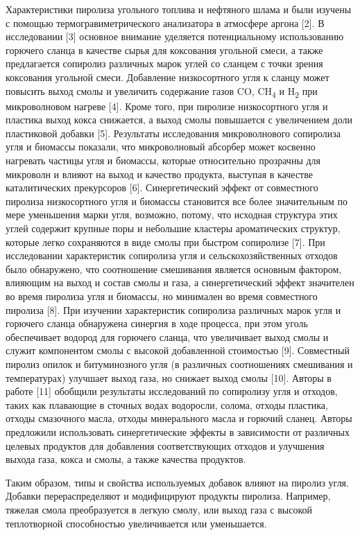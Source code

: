 \begin{multicols}{2}
Характеристики пиролиза угольного топлива и нефтяного шлама и были
изучены с помощью термогравиметрического анализатора в атмосфере аргона
{[}2{]}. В исследовании {[}3{]} основное внимание уделяется
потенциальному использованию горючего сланца в качестве сырья для
коксования угольной смеси, а также предлагается сопиролиз различных
марок углей со сланцем с точки зрения коксования угольной смеси.
Добавление низкосортного угля к сланцу может повысить выход смолы и
увеличить содержание газов CO, CH\textsubscript{4} и H\textsubscript{2}
при микроволновом нагреве {[}4{]}. Кроме того, при пиролизе
низкосортного угля и пластика выход кокса снижается, а выход смолы
повышается с увеличением доли пластиковой добавки {[}5{]}. Результаты
исследования микроволнового сопиролиза угля и биомассы показали, что
микроволновый абсорбер может косвенно нагревать частицы угля и биомассы,
которые относительно прозрачны для микроволн и влияют на выход и
качество продукта, выступая в качестве каталитических прекурсоров
{[}6{]}. Синергетический эффект от совместного пиролиза низкосортного
угля и биомассы становится все более значительным по мере уменьшения
марки угля, возможно, потому, что исходная структура этих углей содержит
крупные поры и небольшие кластеры ароматических структур, которые легко
сохраняются в виде смолы при быстром сопиролизе {[}7{]}. При
исследовании характеристик сопиролиза угля и сельскохозяйственных
отходов было обнаружено, что соотношение смешивания является основным
фактором, влияющим на выход и состав смолы и газа, а синергетический
эффект значителен во время пиролиза угля и биомассы, но минимален во
время совместного пиролиза {[}8{]}. При изучении характеристик
сопиролиза различных марок угля и горючего сланца обнаружена синергия в
ходе процесса, при этом уголь обеспечивает водород для горючего сланца,
что увеличивает выход смолы и служит компонентом смолы с высокой
добавленной стоимостью {[}9{]}. Совместный пиролиз опилок и
битуминозного угля (в различных соотношениях смешивания и температурах)
улучшает выход газа, но снижает выход смолы {[}10{]}. Авторы в работе
{[}11{]} обобщили результаты исследований по сопиролизу угля и отходов,
таких как плавающие в сточных водах водоросли, солома, отходы пластика,
отходы смазочного масла, отходы минерального масла и горючий сланец.
Авторы предложили использовать синергетические эффекты в зависимости от
различных целевых продуктов для добавления соответствующих отходов и
улучшения выхода газа, кокса и смолы, а также качества продуктов.

Таким образом, типы и свойства используемых добавок влияют на пиролиз
угля. Добавки перераспределяют и модифицируют продукты пиролиза.
Например, тяжелая смола преобразуется в легкую смолу, или выход газа с
высокой теплотворной способностью увеличивается или уменьшается.


\end{multicols}

